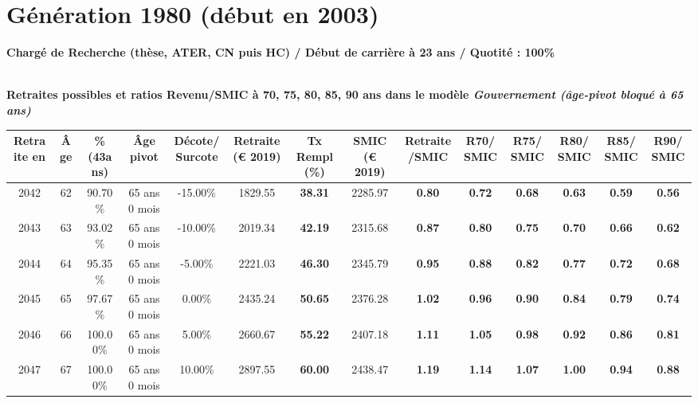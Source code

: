 \newpage 
 
\section{Génération 1980 (début en 2003)\label{CR_100_1980_23_0}} 
 
{\bf \noindent Chargé de Recherche (thèse, ATER, CN puis HC) / Début de carrière à 23 ans / Quotité : 100\%}  ~ 

 ~\\{\bf \noindent Retraites possibles et ratios Revenu/SMIC à 70, 75, 80, 85, 90 ans dans le modèle \emph{Gouvernement (âge-pivot bloqué à 65 ans)}}  
 
\begin{adjustbox}{max width=\textwidth} 
\begin{tabular}[htb]{|c|c||c|c|c||c|c||c|c||c|c|c|c|c|} 
\hline 
 Retraite en &  Âge &  \%(43ans) &  Âge pivot &  Décote/Surcote &  Retraite (\euro{} 2019) &  Tx Rempl(\%) &  SMIC (\euro{} 2019) &  Retraite/SMIC &  R70/SMIC &  R75/SMIC &  R80/SMIC &  R85/SMIC &  R90/SMIC \\ 
\hline \hline 
 2042 &  62 &  90.70\% &  65 ans 0 mois &  -15.00\% &  1829.55 &  {\bf 38.31} &  2285.97 &  {\bf {\color{red} 0.80}} &  {\bf {\color{red} 0.72}} &  {\bf {\color{red} 0.68}} &  {\bf {\color{red} 0.63}} &  {\bf {\color{red} 0.59}} &  {\bf {\color{red} 0.56}} \\ 
\hline 
 2043 &  63 &  93.02\% &  65 ans 0 mois &  -10.00\% &  2019.34 &  {\bf 42.19} &  2315.68 &  {\bf {\color{red} 0.87}} &  {\bf {\color{red} 0.80}} &  {\bf {\color{red} 0.75}} &  {\bf {\color{red} 0.70}} &  {\bf {\color{red} 0.66}} &  {\bf {\color{red} 0.62}} \\ 
\hline 
 2044 &  64 &  95.35\% &  65 ans 0 mois &  -5.00\% &  2221.03 &  {\bf 46.30} &  2345.79 &  {\bf {\color{red} 0.95}} &  {\bf {\color{red} 0.88}} &  {\bf {\color{red} 0.82}} &  {\bf {\color{red} 0.77}} &  {\bf {\color{red} 0.72}} &  {\bf {\color{red} 0.68}} \\ 
\hline 
 2045 &  65 &  97.67\% &  65 ans 0 mois &  0.00\% &  2435.24 &  {\bf 50.65} &  2376.28 &  {\bf 1.02} &  {\bf {\color{red} 0.96}} &  {\bf {\color{red} 0.90}} &  {\bf {\color{red} 0.84}} &  {\bf {\color{red} 0.79}} &  {\bf {\color{red} 0.74}} \\ 
\hline 
 2046 &  66 &  100.00\% &  65 ans 0 mois &  5.00\% &  2660.67 &  {\bf 55.22} &  2407.18 &  {\bf 1.11} &  {\bf 1.05} &  {\bf {\color{red} 0.98}} &  {\bf {\color{red} 0.92}} &  {\bf {\color{red} 0.86}} &  {\bf {\color{red} 0.81}} \\ 
\hline 
 2047 &  67 &  100.00\% &  65 ans 0 mois &  10.00\% &  2897.55 &  {\bf 60.00} &  2438.47 &  {\bf 1.19} &  {\bf 1.14} &  {\bf 1.07} &  {\bf 1.00} &  {\bf {\color{red} 0.94}} &  {\bf {\color{red} 0.88}} \\ 
\hline 
\hline 
\end{tabular} 
\end{adjustbox} 
 
